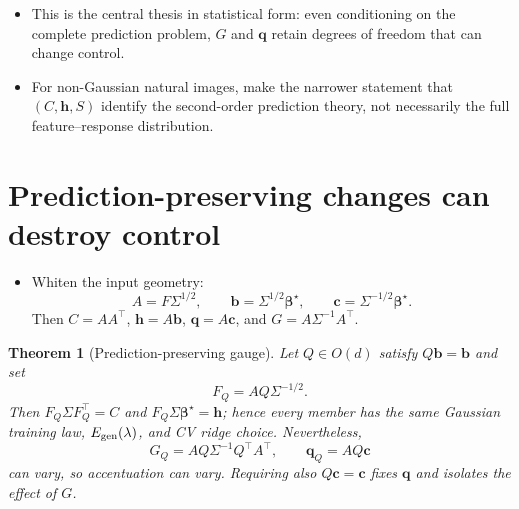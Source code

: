 \documentclass{article}
\newtheorem{theorem}{Theorem}
\newcommand{\bstar}{\bm\beta^{\star}}
\newcommand{\Egen}{E_{\rm gen}}
\begin{document}
\begin{itemize}[leftmargin=1.3em]
  \item This is the central thesis in statistical form: even conditioning on
        the complete prediction problem, $G$ and $\bm q$ retain degrees of
        freedom that can change control.
  \item For non-Gaussian natural images, make the narrower statement that
        $(C,\bm h,S)$ identify the second-order prediction theory, not
        necessarily the full feature--response distribution.
\end{itemize}

\section{Prediction-preserving changes can destroy control}
\label{sec:gauge}

\begin{itemize}[leftmargin=1.3em]
  \item Whiten the input geometry:
  \begin{equation}
    A=F\Sigma^{1/2},\qquad
    \bm b=\Sigma^{1/2}\bstar,\qquad
    \bm c=\Sigma^{-1/2}\bstar.
    \label{eq:whitened}
  \end{equation}
  Then $C=AA^\top$, $\bm h=A\bm b$, $\bm q=A\bm c$, and
  $G=A\Sigma^{-1}A^\top$.
\end{itemize}

\begin{theorem}[Prediction-preserving gauge]
\label{thm:gauge}
Let $Q\in O(d)$ satisfy $Q\bm b=\bm b$ and set
\begin{equation}
  F_Q=AQ\Sigma^{-1/2}.
  \label{eq:gauge}
\end{equation}
Then $F_Q\Sigma F_Q^\top=C$ and $F_Q\Sigma\bstar=\bm h$; hence every member
has the same Gaussian training law, $\Egen(\lambda)$, and CV ridge choice.
Nevertheless,
\begin{equation}
  G_Q=AQ\Sigma^{-1}Q^\top A^\top,
  \qquad \bm q_Q=AQ\bm c
  \label{eq:gauge-control}
\end{equation}
can vary, so accentuation can vary. Requiring also $Q\bm c=\bm c$ fixes
$\bm q$ and isolates the effect of $G$.
\end{theorem}
\end{document}
